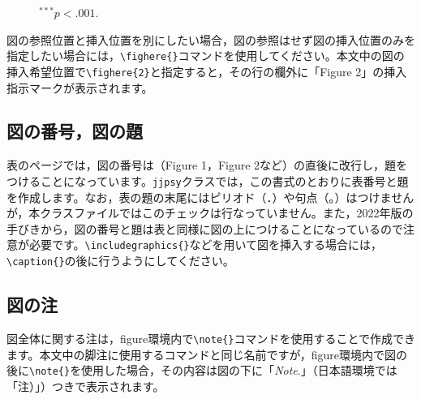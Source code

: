 \documentclass{jjpsy}
\begin{document}
\begin{figure}
\begin{minipage}{32\zh}

    $^{\scriptscriptstyle{***}}p<.001$.
  \end{minipage}
\end{figure}

図の参照位置と挿入位置を別にしたい場合，図の参照はせず図の挿入位置のみを指定したい場合には，\texttt{\textbackslash{}fighere\{\}}コマンドを使用してください。本文中の図の挿入希望位置で\texttt{\textbackslash{}fighere\{2\}}と指定すると，その行の欄外に「Figure 2」の挿入指示マークが表示されます。


\subsection{図の番号，図の題}

表のページでは，図の番号は（Figure 1，Figure 2など）の直後に改行し，題をつけることになっています。\texttt{jjpsy}クラスでは，この書式のとおりに表番号と題を作成します。なお，表の題の末尾にはピリオド（．）や句点（。）はつけませんが，本クラスファイルではこのチェックは行なっていません。また，2022年版の手びきから，図の番号と題は表と同様に図の上につけることになっているので注意が必要です。\texttt{\textbackslash{}includegraphics\{\}}などを用いて図を挿入する場合には，\texttt{\textbackslash{}caption\{\}}の後に行うようにしてください。


\subsection{図の注}

図全体に関する注は，figure環境内で\texttt{\textbackslash{}note\{\}}コマンドを使用することで作成できます。本文中の脚注に使用するコマンドと同じ名前ですが，figure環境内で図の後に\texttt{\textbackslash{}note\{\}}を使用した場合，その内容は図の下に「\emph{Note}.」（日本語環境では「注）」）つきで表示されます。
\end{document}
